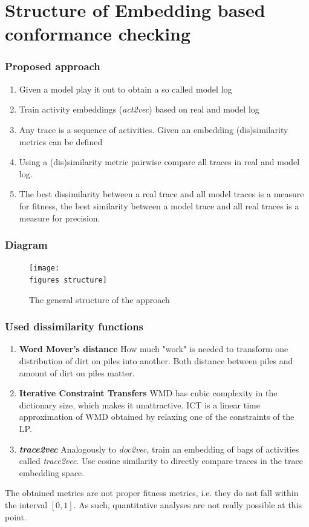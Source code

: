 \documentclass{beamer}
\newcommand{\figures}{../figures/}
\begin{document}
	\section{Structure of Embedding based conformance checking}
\begin{frame}
	\frametitle{Proposed approach}
	\begin{enumerate}
		\item Given a model play it out to obtain a so called model log
		\item Train activity embeddings (\emph{act2vec}) based on real and model log
		\item Any trace is a sequence of activities. Given an embedding (dis)similarity metrics can be defined
		\item Using a (dis)similarity metric pairwise compare all traces in real and model log.
		\item The best dissimilarity between a real trace and all model traces is a measure for fitness, the best similarity between a model trace and all real traces is a measure for precision.
	\end{enumerate}
\end{frame}
	
	
	\begin{frame}
		\frametitle{Diagram}
		\begin{figure}
			\texttt{[image: \\figures structure]}
			\caption{The general structure of the approach}
			\label{fig:structure}
		\end{figure}
	\end{frame}
	
	
	\begin{frame}
		\frametitle{Used dissimilarity functions}
		\begin{enumerate}
			\item \textbf{Word Mover's distance}\cite{KSKW15} How much "work" is needed to transform one distribution of dirt on piles into another. Both distance between piles and amount of dirt on piles matter.
			\item \textbf{Iterative Constraint Transfers}\cite{AtMi18} WMD has cubic complexity in the dictionary size, which makes it unattractive. ICT is a linear time approximation of WMD obtained by relaxing one of the constraints of the LP.
			\item \textbf{\emph{trace2vec}}\cite{KBWe18} Analogously to \emph{doc2vec}, train an embedding of bags of activities called \emph{trace2vec}. Use cosine similarity to directly compare traces in the trace embedding space.
		\end{enumerate}
	\alert{The obtained metrics are not proper fitness metrics, i.e. they do not fall within the interval $[0,1]$. As such, quantitative analyses are not really possible at this point.}
	\end{frame}
	
\end{document}
